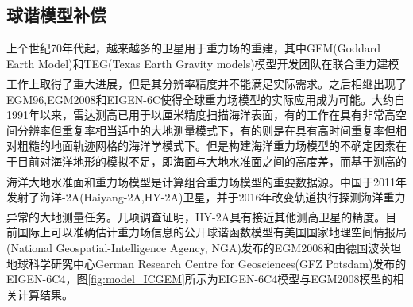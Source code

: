 \documentclass[12pt,a4,utf8]{article}
\newcommand{\upcite}[1]{\textsuperscript{\textsuperscript{\cite{#1}}}} %
\begin{document}
\subsection{球谐模型补偿}
上个世纪70年代起，越来越多的卫星用于重力场的重建，其中GEM(Goddard Earth Model)和TEG(Texas Earth Gravity models)模型开发团队在联合重力建模工作上取得了重大进展\upcite{lerch1972gravitational,tapley1997teg}，但是其分辨率精度并不能满足实际需求。之后相继出现了EGM96,EGM2008和EIGEN-6C使得全球重力场模型的实际应用成为可能。大约自1991年以来，雷达测高已用于以厘米精度扫描海洋表面，有的工作在具有非常高空间分辨率但重复率相当适中的大地测量模式下，有的则是在具有高时间重复率但相对粗糙的地面轨迹网格的海洋学模式下。但是构建海洋重力场模型的不确定因素在于目前对海洋地形的模拟不足，即海面与大地水准面之间的高度差，而基于测高的海洋大地水准面和重力场模型是计算组合重力场模型的重要数据源\upcite{pavlis2012development,flechtner2021satellite}。中国于2011年发射了海洋-2A(Haiyang-2A,HY-2A)卫星，并于2016年改变轨道执行探测海洋重力异常的大地测量任务。几项调查证明\upcite{jiang2019measurement,liu2020preliminary,wan2020vertical,zhang2020inversion,zhu2019hy,ji2021deflections,guo2022accuracy}，HY-2A具有接近其他测高卫星的精度。目前国际上可以准确估计重力场信息的公开球谐函数模型有美国国家地理空间情报局(National Geospatial-Intelligence Agency, NGA)发布的EGM2008和由德国波茨坦地球科学研究中心German Research Centre for Geosciences(GFZ Potsdam)发布的EIGEN-6C4，图\ref{fig:model_ICGEM}所示为EIGEN-6C4模型与EGM2008模型的相关计算结果。
\end{document}
